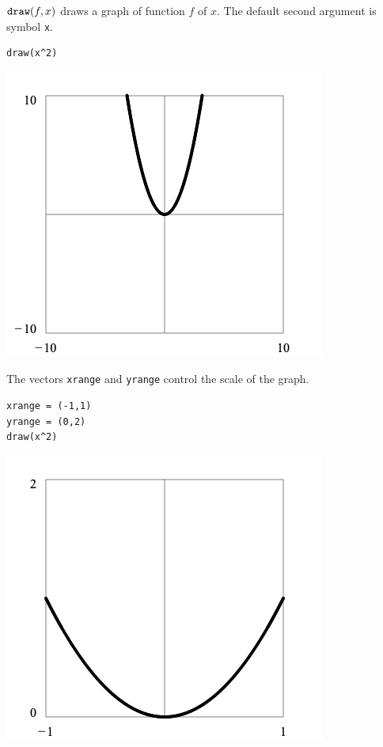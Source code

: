 $\text{\tt draw}(f,x)$ draws a graph of function $f$ of $x$.
The default second argument is symbol \verb$x$.

{\color{blue}
\begin{verbatim}
draw(x^2)
\end{verbatim}
}

\begin{center}
\includegraphics[scale=0.4]{parabola1.png}
\end{center}

\noindent
The vectors \verb$xrange$ and \verb$yrange$ control the scale of the graph.

{\color{blue}
\begin{verbatim}
xrange = (-1,1)
yrange = (0,2)
draw(x^2)
\end{verbatim}
}

\begin{center}
\includegraphics[scale=0.4]{parabola2.png}
\end{center}

